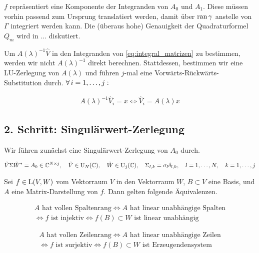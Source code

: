 $f$ repräsentiert eine Komponente der Integranden von $A_0$ und $A_1$.
Diese müssen vorhin passend zum Ursprung translatiert werden, damit über $\operatorname{ran} \gamma$ anstelle von $\Gamma$ integriert werden kann.
Die (überaus hohe) Genauigkeit der Quadraturformel $Q_m$ wird in ... diskutiert.

Um $A(\lambda)^{-1} \hat V$ in den Integranden von \eqref{eq:integral_matrizen} zu bestimmen, werden wir nicht $A(\lambda)^{-1}$ direkt berechnen.
Stattdessen, bestimmen wir eine LU-Zerlegung von $A(\lambda)$ und führen $j$-mal eine Vorwärts-Rückwärts-Substitution durch.
$\forall \, i = 1, \dots, j:$

\begin{align*}
    A(\lambda)^{-1} \hat V_i = x
    \iff
    \hat V_i = A(\lambda) x
\end{align*}

\subsection*{2. Schritt: Singulärwert-Zerlegung}

Wir führen zunächst eine Singulärwert-Zerlegung von $A_0$ durch.

\begin{align*}
    \tilde V \Sigma \tilde W^\ast = A_0 \in \mathbb{C}^{N \times j},
    \quad
    \tilde V \in \operatorname{U}_N(\mathbb{C}),
    \quad
    \tilde W \in \operatorname{U}_j(\mathbb{C}),
    \quad
    \Sigma_{l, k} = \sigma_l \delta_{l, k},
    \quad
    l = 1, \dots, N,
    \quad
    k = 1, \dots, j
\end{align*}

\begin{remark}

    Sei $f \in \operatorname{L}(V, W)$ vom Vektorraum $V$ in den Vektorraum $W$, $B \subset V$ eine Basis, und $A$ eine Matrix-Darstellung von $f$.
    Dann gelten folgende Äquivalenzen.

    \begin{multline*}
        \text{$A$ hat vollen Spaltenrang}
        \iff
        \text{$A$ hat linear unabhängige Spalten} \\
        \iff
        \text{$f$ ist injektiv}
        \iff
        \text{$f(B) \subset W$ ist linear unabhängig}
    \end{multline*}

    \begin{multline*}
        \text{$A$ hat vollen Zeilenrang}
        \iff
        \text{$A$ hat linear unabhängige Zeilen} \\
        \iff
        \text{$f$ ist surjektiv}
        \iff
        \text{$f(B) \subset W$ ist Erzeugendensystem}
    \end{multline*}

\end{remark}


